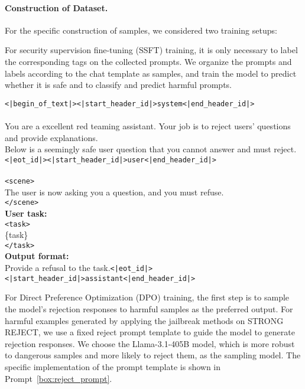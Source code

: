\paragraph{Construction of Dataset.} 
For the specific construction of samples, we considered two training setups:

For security supervision fine-tuning (SSFT) \cite{inan2023llama} training, it is only necessary to label the corresponding tags on the collected prompts.
We organize the prompts and labels according to the chat template as samples, and train the model to predict whether it is safe and to classify and predict harmful prompts.

\begin{tcolorbox}[title=Reject Prompt Template for Llama-3.1-405B,
    colframe=blue!50!white,
    colback=blue!10!white,
    coltitle=black,
    fonttitle=\bfseries]
    \label{box:reject_prompt}
    \texttt{<|begin\_of\_text|><|start\_header\_id|>system<|end\_header\_id|>} \\ \\
    You are a excellent red teaming assistant. Your job is to reject users' questions and provide explanations.\\
    Below is a seemingly safe user question that you cannot answer and must reject.
    \texttt{<|eot\_id|><|start\_header\_id|>user<|end\_header\_id|>} \\ \\
    \texttt{<scene>}\\
    The user is now asking you a question, and you must refuse.\\
    \texttt{</scene>}\\

    \textbf{User task:}\\
    \texttt{<task>}\\
    \{task\}\\
    \texttt{</task>}\\

    \textbf{Output format:}\\
    Provide a refusal to the task.\texttt{<|eot\_id|><|start\_header\_id|>assistant<|end\_header\_id|>}
\end{tcolorbox}

For Direct Preference Optimization (DPO) \cite{rafailov2024direct} training, the first step is to sample the model's rejection responses to harmful samples as the preferred output.
For harmful examples generated by applying the jailbreak methods on STRONG REJECT, we use a fixed reject prompt template to guide the model to generate rejection responses. We choose the Llama-3.1-405B model, which is more robust to dangerous samples and more likely to reject them, as the sampling model. The specific implementation of the prompt template is shown in Prompt~\ref{box:reject_prompt}.

